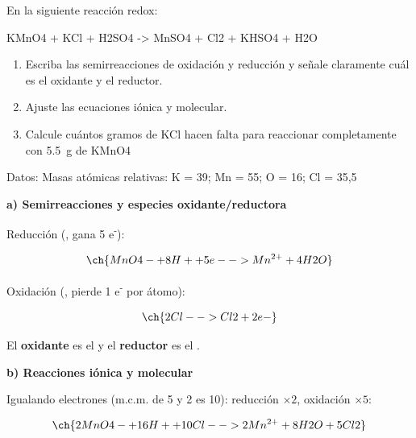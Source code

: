 \begin{exerciseEVAU}

   En la siguiente reacción redox:

    \begin{reaction*}
        KMnO4 + KCl + H2SO4 -> MnSO4 + Cl2 + KHSO4 + H2O
    \end{reaction*}

    \begin{enumerate}[label=\letraminuscula]
        \item Escriba las semirreacciones de oxidación y reducción y señale claramente cuál es el oxidante
        y el reductor.
        \item Ajuste las ecuaciones iónica y molecular.
        \item Calcule cuántos gramos de KCl hacen falta para reaccionar completamente con \SI{5.5}{\g} de 
        KMnO4
    \end{enumerate}

    Datos: Masas atómicas relativas: K = 39; Mn = 55; O = 16; Cl = 35,5

    \begin{solu}

        \textbf{a) Semirreacciones y especies oxidante/reductora}

        Reducción (, gana 5 e\textsuperscript{-}):

        \begin{equation*}
            \ch{MnO4- + 8 H+ + 5 e- -> Mn^{2+} + 4 H2O}
        \end{equation*}

        Oxidación (, pierde 1 e\textsuperscript{-} por átomo):

        \begin{equation*}
            \ch{2 Cl- -> Cl2 + 2 e-}
        \end{equation*}

        El \textbf{oxidante} es el  y el \textbf{reductor} es el .

        \textbf{b) Reacciones iónica y molecular}

        Igualando electrones (m.c.m. de 5 y 2 es 10): reducción \(\times 2\), oxidación \(\times 5\):

        \begin{equation*}
            \ch{2 MnO4- + 16 H+ + 10 Cl- -> 2 Mn^{2+} + 8 H2O + 5 Cl2}
        \end{equation*}


\end{solu}
\end{exerciseEVAU}
